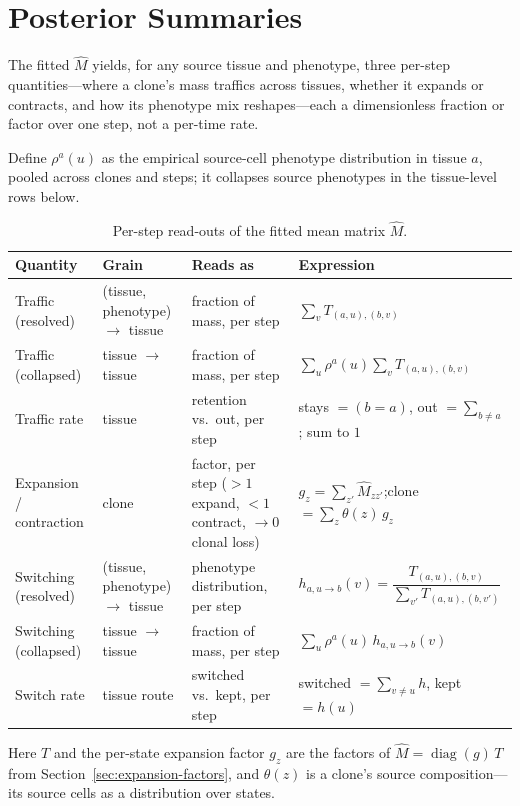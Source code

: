 \documentclass[11pt]{article}
\theoremstyle{definition}
\begin{document}
\section{Posterior Summaries}

The fitted $\widehat{M}$ yields, for any source tissue and phenotype, three
per-step quantities---where a clone's mass traffics across tissues, whether it
expands or contracts, and how its phenotype mix reshapes---each a dimensionless
fraction or factor over one step, not a per-time rate.

Define $\rho^a(u)$ as the empirical source-cell phenotype distribution in tissue
$a$, pooled across clones and steps; it collapses source phenotypes in the
tissue-level rows below.

\begin{table}[h]
\centering
\small
\renewcommand{\arraystretch}{1.4}
\begin{tabular}{@{}p{2.15cm}p{2.35cm}p{3.2cm}p{5.3cm}@{}}
\toprule
\textbf{Quantity} & \textbf{Grain} & \textbf{Reads as} & \textbf{Expression}\\
\midrule
Traffic (resolved)
  & (tissue, phenotype) $\to$ tissue
  & fraction of mass, per step
  & $\sum_{v} T_{(a,u),(b,v)}$\\
Traffic (collapsed)
  & tissue $\to$ tissue
  & fraction of mass, per step
  & $\sum_{u}\rho^a(u)\sum_{v} T_{(a,u),(b,v)}$\\
Traffic rate
  & tissue
  & retention vs.\ out, per step
  & stays $=(b{=}a)$, out $=\sum_{b\neq a}$; sum to $1$\\
Expansion / contraction
  & clone
  & factor, per step ($>1$ expand, $<1$ contract, $\to 0$ clonal loss)
  & $g_z=\sum_{z'}\widehat{M}_{zz'}$;\newline clone $=\sum_{z}\theta(z)\,g_z$\\
Switching (resolved)
  & (tissue, phenotype) $\to$ tissue
  & phenotype distribution, per step
  & $h_{a,u\to b}(v)=\dfrac{T_{(a,u),(b,v)}}{\sum_{v'} T_{(a,u),(b,v')}}$\\
Switching (collapsed)
  & tissue $\to$ tissue
  & fraction of mass, per step
  & $\sum_{u}\rho^a(u)\,h_{a,u\to b}(v)$\\
Switch rate
  & tissue route
  & switched vs.\ kept, per step
  & switched $=\sum_{v\neq u} h$, kept $=h(u)$\\
\bottomrule
\end{tabular}
\caption{Per-step read-outs of the fitted mean matrix $\widehat{M}$.}
\label{tab:readouts}
\end{table}

Here $T$ and the per-state expansion factor $g_z$ are the factors of
$\widehat{M}=\operatorname{diag}(g)\,T$ from Section~\ref{sec:expansion-factors},
and $\theta(z)$ is a clone's source composition---its source cells as a
distribution over states.
\end{document}
